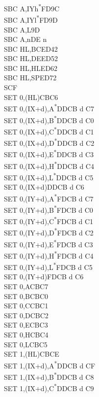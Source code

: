 \documentclass[oneside,a4paper]{book}
\begin{document}
\begin{multicols}{3}
{\begin{tabbing}
SBC A,IYh\textsuperscript{*}\>FD9C\\
SBC A,IYl\textsuperscript{*}\>FD9D\\
SBC A,L\>9D\\
SBC A,n\>DE n\\
SBC HL,BC\>ED42\\
SBC HL,DE\>ED52\\
SBC HL,HL\>ED62\\
SBC HL,SP\>ED72\\
SCF\\
SET 0,(HL)\>CBC6\\
SET 0,(IX+d),A\textsuperscript{*}\>DDCB d C7\\
SET 0,(IX+d),B\textsuperscript{*}\>DDCB d C0\\
SET 0,(IX+d),C\textsuperscript{*}\>DDCB d C1\\
SET 0,(IX+d),D\textsuperscript{*}\>DDCB d C2\\
SET 0,(IX+d),E\textsuperscript{*}\>DDCB d C3\\
SET 0,(IX+d),H\textsuperscript{*}\>DDCB d C4\\
SET 0,(IX+d),L\textsuperscript{*}\>DDCB d C5\\
SET 0,(IX+d)\>DDCB d C6\\
SET 0,(IY+d),A\textsuperscript{*}\>FDCB d C7\\
SET 0,(IY+d),B\textsuperscript{*}\>FDCB d C0\\
SET 0,(IY+d),C\textsuperscript{*}\>FDCB d C1\\
SET 0,(IY+d),D\textsuperscript{*}\>FDCB d C2\\
SET 0,(IY+d),E\textsuperscript{*}\>FDCB d C3\\
SET 0,(IY+d),H\textsuperscript{*}\>FDCB d C4\\
SET 0,(IY+d),L\textsuperscript{*}\>FDCB d C5\\
SET 0,(IY+d)\>FDCB d C6\\
SET 0,A\>CBC7\\
SET 0,B\>CBC0\\
SET 0,C\>CBC1\\
SET 0,D\>CBC2\\
SET 0,E\>CBC3\\
SET 0,H\>CBC4\\
SET 0,L\>CBC5\\
SET 1,(HL)\>CBCE\\
SET 1,(IX+d),A\textsuperscript{*}\>DDCB d CF\\
SET 1,(IX+d),B\textsuperscript{*}\>DDCB d C8\\
SET 1,(IX+d),C\textsuperscript{*}\>DDCB d C9\\

\end{tabbing}}
\end{multicols}
\end{document}
